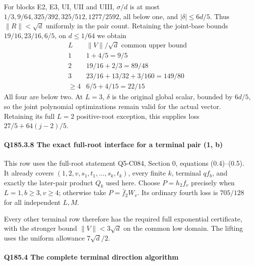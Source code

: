 For blocks E2, E3, UI, UII and UIII, \(\sigma/d\) is at most \(1/3,\allowbreak \allowbreak  9/64,\allowbreak \allowbreak  325/392,\allowbreak \allowbreak  325/512,\allowbreak \allowbreak  1277/2592\), all below one, and \(|\delta|\le6d/5\). Thus \(\|R\|<\sqrt d\) uniformly in the pair count. Retaining the joint-base bounds \(19/16,\allowbreak \allowbreak  23/16,\allowbreak \allowbreak  6/5\), on \(d\le1/64\) we obtain
\[
\begin{array}{c|c}
L&\|V\|/\sqrt d\text{ common upper bound}\\
1&1+4/5=9/5\\
2&19/16+2/3=89/48\\
3&23/16+13/32+3/160=149/80\\
\ge4&6/5+4/15=22/15
\end{array}                                           \tag{Q185.17}
\]
All four are below two. At \(L=3\), \(\delta\) is the original global scalar, bounded by \(6d/5\), so the joint polynomial optimizations remain valid for the actual vector. Retaining its full \(L=2\) positive-root exception, this supplies loss \(27/5+64(j-2)/5\).

\paragraph{Q185.3.8 The exact full-root interface for a terminal pair (1, b)}

This row uses the full-root statement Q5-C084, Section 0, equations (0.4)--(0.5). It already covers \((1,\allowbreak \allowbreak  2,\allowbreak \allowbreak  v,\allowbreak \allowbreak  s_1,\allowbreak \allowbreak  t_1,\allowbreak \allowbreak  \ldots,\allowbreak \allowbreak  s_k,\allowbreak \allowbreak  t_k)\), every finite \(k\), terminal \(qf_b\), and exactly the later-pair product \(Q_k\) used here. Choose \(P=h_2f_v\) precisely when \(L=1,\allowbreak \allowbreak  b\ge3,\allowbreak \allowbreak  v\ge4\); otherwise take \(P=\bar f_2W_v\). Its ordinary fourth loss is \(705/128\) for all independent \(L,\allowbreak \allowbreak  M\).

Every other terminal row therefore has the required full exponential certificate, with the stronger bound \(\|V\|<3\sqrt d\) on the common low domain. The lifting uses the uniform allowance \(7\sqrt d/2\).

\paragraph{Q185.4 The complete terminal direction algorithm}

